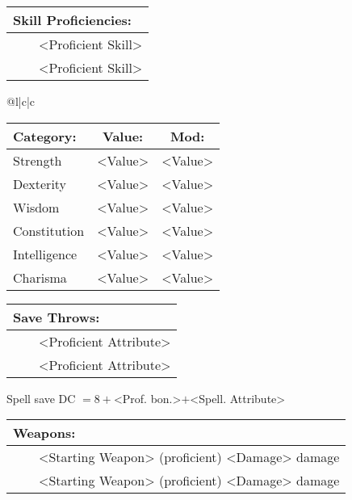\documentclass[11pt]{article}
\newcommand{\tabitem}{~~\llap{--}~~}
\begin{document}
\begin{multicols}{2}
\vspace{2mm}

\noindent \begin{tabularx}{\linewidth}{@{}l}
{\Large \textbf{Skill Proficiencies:}} \\
\hline
\tabitem <Proficient Skill> \\
\tabitem <Proficient Skill>
		\end{tabularx}

\vspace{4mm}

\noindent \begin{tabularx}{\linewidth}{@{}l|c|c}
 \\
\hline
		\end{tabularx}
\noindent \begin{tabular}{@{}l|c|c}
\textbf{Category:} 			& \textbf{Value:} 	& \textbf{Mod:} \\
\hline
Strength 					& <Value> 				& <Value>		\\
Dexterity 					& <Value> 				& <Value>		\\
Wisdom 						& <Value>				& <Value>		\\
Constitution 				& <Value> 				& <Value>		\\
Intelligence 				& <Value> 				& <Value>		\\
Charisma 					& <Value> 				& <Value>
		\end{tabular}

\vspace{4mm}

\noindent \begin{tabularx}{\linewidth}{@{}l}
{\Large \textbf{Save Throws:}} \\
\hline
\tabitem <Proficient Attribute> \\
\tabitem <Proficient Attribute> \\
		\end{tabularx}
\noindent Spell save DC $= 8 + $<Prof. bon.>$ + $<Spell. Attribute>

\vspace{4mm}

\noindent \begin{tabularx}{\linewidth}{@{}l}
{\Large \textbf{Weapons:}} \\
\hline
\tabitem <Starting Weapon> (proficient) <Damage> damage \\
\tabitem <Starting Weapon> (proficient) <Damage> damage
		\end{tabularx}


\end{multicols}
\end{document}

